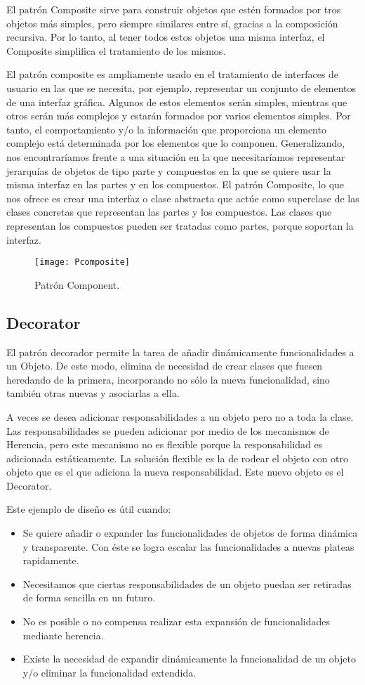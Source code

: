 El patrón Composite sirve para construir objetos que estén formados por tros objetos más simples, pero siempre similares entre sí, gracias a la composición recursiva. Por lo tanto, al tener todos estos objetos una misma interfaz, el Composite simplifica el tratamiento de los mismos.

El patrón composite es ampliamente usado en el tratamiento de interfaces de usuario en las que se necesita, por ejemplo, representar un conjunto de elementos de una interfaz gráfica. Algunos de estos elementos serán simples, mientras que otros serán más complejos y estarán formados por varios elementos simples. Por tanto, el comportamiento y/o la información que proporciona un elemento complejo está determinada por los elementos que lo componen.
Generalizando, nos encontraríamos frente a una situación en la que necesitaríamos representar jerarquías de objetos de tipo parte y compuestos en la que se quiere usar la misma interfaz en las partes y en los compuestos. El patrón Composite, lo que nos ofrece es crear una interfaz o clase abstracta que actúe como superclase de las clases concretas que representan las partes y los compuestos. Las clases que representan los compuestos pueden ser tratadas como partes, porque soportan la interfaz.

\begin{figure}[H]
\centering
\texttt{[image: Pcomposite]}
\caption{Patrón Component.}
\end{figure}

\subsection{Decorator}

El patrón decorador permite la tarea de añadir dinámicamente funcionalidades a un Objeto. De este modo, elimina de necesidad de crear clases que fuesen heredando de la primera, incorporando no sólo la nueva funcionalidad, sino también otras nuevas y asociarlas a ella.

A veces se desea adicionar responsabilidades a un objeto pero no a toda la clase. Las responsabilidades se pueden adicionar por medio de los mecanismos de Herencia, pero este mecanismo no es flexible porque la responsabilidad es adicionada estáticamente. La solución flexible es la de rodear el objeto con otro objeto que es el que adiciona la nueva responsabilidad. Este nuevo objeto es el Decorator.

Este ejemplo de diseño  es útil cuando:
\begin{itemize}
    \item Se quiere añadir o expander las funcionalidades de objetos de forma dinámica y transparente. Con éste se logra escalar las funcionalidades a nuevas plateas rapidamente.
 \item Necesitamos que ciertas responsabilidades de un objeto puedan ser retiradas de forma sencilla en un futuro.
 \item No es posible o no compensa realizar esta expansión de funcionalidades mediante herencia.
 \item Existe la necesidad de expandir dinámicamente la funcionalidad de un objeto y/o eliminar la funcionalidad extendida.
\end{itemize}


